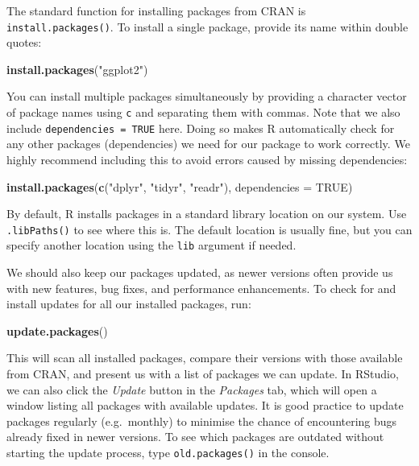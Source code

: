 \documentclass[
]{book}
\newenvironment{Shaded}{\begin{snugshade}}{\end{snugshade}}
\newcommand{\AttributeTok}[1]{\textcolor[rgb]{0.13,0.29,0.53}{#1}}
\newcommand{\ConstantTok}[1]{\textcolor[rgb]{0.56,0.35,0.01}{#1}}
\newcommand{\FunctionTok}[1]{\textcolor[rgb]{0.13,0.29,0.53}{\textbf{#1}}}
\newcommand{\NormalTok}[1]{#1}
\newcommand{\StringTok}[1]{\textcolor[rgb]{0.31,0.60,0.02}{#1}}
\begin{document}
The standard function for installing packages from CRAN is \texttt{install.packages()}. To install a single package, provide its name within double quotes:

\begin{Shaded}
\begin{Highlighting}[]
\FunctionTok{install.packages}\NormalTok{(}\StringTok{"ggplot2"}\NormalTok{)}
\end{Highlighting}
\end{Shaded}

You can install multiple packages simultaneously by providing a character vector of package names using \texttt{c} and separating them with commas. Note that we also include \texttt{dependencies\ =\ TRUE} here. Doing so makes R automatically check for any other packages (dependencies) we need for our package to work correctly. We highly recommend including this to avoid errors caused by missing dependencies:

\begin{Shaded}
\begin{Highlighting}[]
\FunctionTok{install.packages}\NormalTok{(}\FunctionTok{c}\NormalTok{(}\StringTok{"dplyr"}\NormalTok{, }\StringTok{"tidyr"}\NormalTok{, }\StringTok{"readr"}\NormalTok{), }\AttributeTok{dependencies =} \ConstantTok{TRUE}\NormalTok{)}
\end{Highlighting}
\end{Shaded}

By default, R installs packages in a standard library location on our system. Use \texttt{.libPaths()} to see where this is. The default location is usually fine, but you can specify another location using the \texttt{lib} argument if needed.

We should also keep our packages updated, as newer versions often provide us with new features, bug fixes, and performance enhancements. To check for and install updates for all our installed packages, run:

\begin{Shaded}
\begin{Highlighting}[]
\FunctionTok{update.packages}\NormalTok{()}
\end{Highlighting}
\end{Shaded}

This will scan all installed packages, compare their versions with those available from CRAN, and present us with a list of packages we can update. In RStudio, we can also click the \emph{Update} button in the \emph{Packages} tab, which will open a window listing all packages with available updates. It is good practice to update packages regularly (e.g.~monthly) to minimise the chance of encountering bugs already fixed in newer versions. To see which packages are outdated without starting the update process, type \texttt{old.packages()} in the console.
\end{document}
